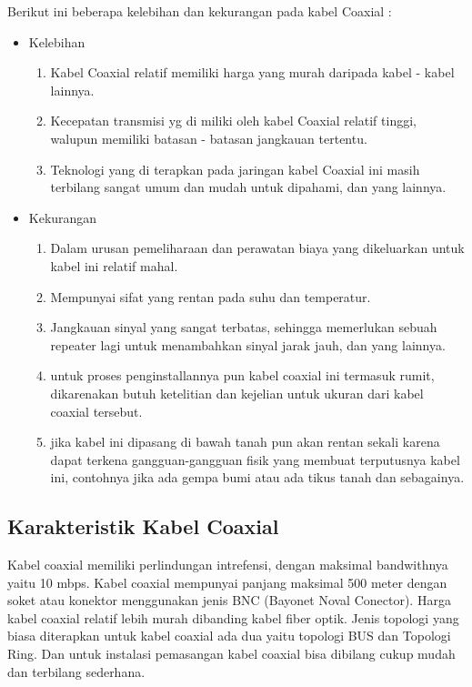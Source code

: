 	Berikut ini beberapa kelebihan dan kekurangan pada kabel Coaxial :
		\begin{itemize}
			\item Kelebihan
				\begin{enumerate}
					\item Kabel Coaxial relatif memiliki harga yang murah daripada kabel - kabel lainnya.
					\item Kecepatan transmisi yg di miliki oleh kabel Coaxial relatif tinggi, walupun memiliki batasan - batasan jangkauan tertentu.
					\item Teknologi yang di terapkan pada jaringan kabel Coaxial ini masih terbilang sangat umum dan mudah untuk dipahami, dan yang lainnya.
				\end{enumerate}
				
			\item Kekurangan
				\begin{enumerate}
					\item Dalam urusan pemeliharaan dan perawatan biaya yang dikeluarkan untuk kabel ini relatif mahal.
					\item Mempunyai sifat yang rentan pada suhu dan temperatur.
					\item Jangkauan sinyal yang sangat terbatas, sehingga memerlukan sebuah repeater lagi untuk menambahkan sinyal jarak jauh, dan yang lainnya.
					\item untuk proses penginstallannya pun kabel coaxial ini termasuk rumit, dikarenakan butuh ketelitian dan kejelian untuk ukuran dari kabel coaxial tersebut.
					\item jika kabel ini dipasang di bawah tanah pun akan rentan sekali karena dapat terkena gangguan-gangguan fisik yang membuat terputusnya kabel ini, contohnya jika ada gempa bumi atau ada tikus tanah dan sebagainya.
				\end{enumerate}
		\end{itemize}
		
	\subsection {Karakteristik Kabel Coaxial}
	Kabel coaxial memiliki perlindungan intrefensi, dengan maksimal bandwithnya yaitu 10 mbps. Kabel coaxial mempunyai panjang maksimal 500 meter dengan soket atau konektor menggunakan jenis BNC (Bayonet Noval Conector). Harga kabel coaxial relatif lebih murah dibanding kabel fiber optik. Jenis topologi yang biasa diterapkan untuk kabel coaxial ada dua yaitu topologi BUS dan Topologi Ring. Dan untuk instalasi pemasangan kabel coaxial bisa dibilang cukup mudah dan terbilang sederhana.
	
